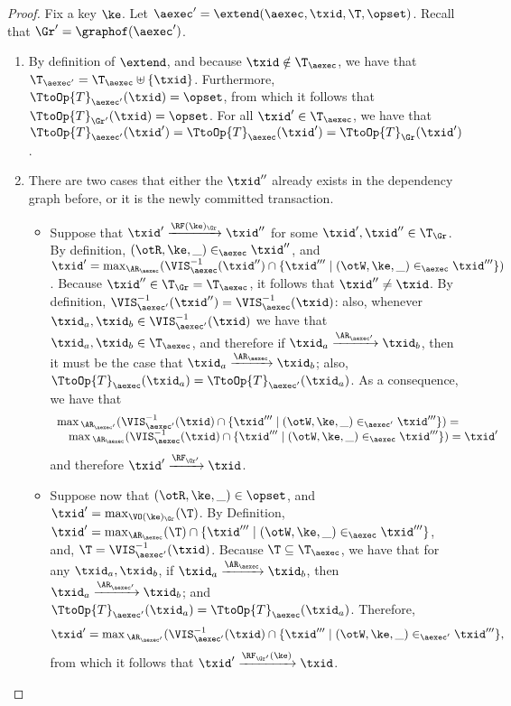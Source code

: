 \begin{proof}
Fix a key $\ke$. Let $\aexec' = \extend(\aexec, \txid, \T, \opset)$. Recall that $\Gr' = \graphof(\aexec')$.

\begin{enumerate}
\item By definition of $\extend$, and 
because $\txid \notin \T_{\aexec}$, we have that 
$\T_{\aexec'} = \T_{\aexec} \uplus \{\txid\}$. Furthermore, $\TtoOp{T}_{\aexec'}(\txid) = \opset$, 
from which it follows that $\TtoOp{T}_{\Gr'}(\txid) = \opset$.
For all $\txid' \in \T_{\aexec}$, we have that $\TtoOp{T}_{\aexec'}(\txid') = 
\TtoOp{T}_{\aexec}(\txid') = \TtoOp{T}_{\Gr}(\txid')$.
\item
There are two cases that either the \( \txid'' \) already exists in the dependency graph before,
or it is the newly committed transaction.
\begin{itemize}
\item Suppose that $\txid' \xrightarrow{\RF(\ke)_{\Gr}} \txid''$ for some $\txid', \txid'' \in \T_{\Gr}$. 
By definition, $(\otR, \ke, \_) \in_{\aexec} \txid''$,  
and $\txid' = \max_{\AR_{\aexec}}(\VIS_{\aexec}^{-1}(\txid'') \cap \{\txid''' \mid (\otW, \ke, \_) \in_{\aexec} \txid'''\})$. 
Because $\txid'' \in \T_{\Gr} = \T_{\aexec}$, it follows that $\txid'' \neq \txid$. By definition, 
$\VIS^{-1}_{\aexec'}(\txid'') = \VIS^{-1}_{\aexec}(\txid)$: also, whenever 
$\txid_{a}, \txid_{b} \in \VIS^{-1}_{\aexec'}(\txid)$ we have that $\txid_{a}, \txid_{b} \in \T_{\aexec}$, 
and therefore if $\txid_{a} \xrightarrow{\AR_{\aexec'}} \txid_{b}$, then it must be the case 
that $\txid_{a} \xrightarrow{\AR_{\aexec}} \txid_b$; also, $\TtoOp{T}_{\aexec}(\txid_{a}) = \TtoOp{T}_{\aexec'}(\txid_{a})$. 
As a consequence, we have that 
\[
    \begin{array}{l}
    \max{}_{\AR_{\aexec'}}(\VIS^{-1}_{\aexec'}(\txid) \cap \{ \txid''' \mid (\otW, \ke, \_) \in_{\aexec'} \txid'''\}) = \\
    \quad \max{}_{\AR_{\aexec}}(\VIS^{-1}_{\aexec}(\txid) \cap \{ \txid''' \mid (\otW, \ke, \_) \in_{\aexec} \txid'''\}) = \txid'
    \end{array}
\] 
and therefore $\txid' \xrightarrow{\RF_{\Gr'}} \txid$. 

\item Suppose now that $(\otR,\ke, \_) \in \opset$, and $\txid' = \max_{\VO(\ke)_{\Gr}}(\T)$. 
By Definition, $\txid' = \max_{\AR_{\aexec}}(\T) \cap \{ \txid''' \mid (\otW, \ke, \_) \in_{\aexec} \txid'''\}$, 
and, $\T = \VIS^{-1}_{\aexec'}(\txid)$.
Because $\T \subseteq \T_{\aexec}$, we have 
that for any $\txid_{a}, \txid_{b}$, if $\txid_{a} \xrightarrow{\AR_{\aexec}} \txid_{b}$, 
then $\txid_{a} \xrightarrow{\AR_{\aexec'}} \txid_{b}$; and $\TtoOp{T}_{\aexec'}(\txid_{a}) = 
\TtoOp{T}_{\aexec}(\txid_a)$. Therefore, 
\[
    \txid' = \max{}_{\AR_{\aexec'}}(\VIS^{-1}_{\aexec'}(\txid) \cap \{ \txid''' \mid (\otW, \ke, \_) \in_{\aexec'} \txid'''\}, 
\] 
from which it follows that $\txid' \xrightarrow{\RF_{\Gr'}(\ke)}\txid$.


\end{itemize}
\end{enumerate}
\end{proof}

